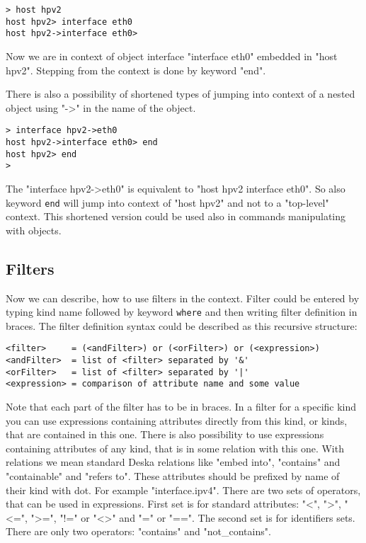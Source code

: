 \documentclass[deska]{subfiles}
\begin{document}
\begin{verbatim}
> host hpv2
host hpv2> interface eth0
host hpv2->interface eth0>
\end{verbatim}

Now we are in context of object interface "interface eth0" embedded in "host hpv2". Stepping from the context is done by
keyword "end".

There is also a possibility of shortened types of jumping into context of a nested object using "->" in the name of the
object.

\begin{verbatim}
> interface hpv2->eth0
host hpv2->interface eth0> end
host hpv2> end
>
\end{verbatim}

The "interface hpv2->eth0" is equivalent to "host hpv2 interface eth0". So also keyword {\tt end} will jump into context of
"host hpv2" and not to a "top-level" context. This shortened version could be used also in commands manipulating with
objects.

\subsection{Filters}

Now we can describe, how to use filters in the context. Filter could be entered by typing kind name followed by keyword
{\tt where} and then writing filter definition in braces. The filter definition syntax could be described as this recursive
structure:

\begin{verbatim}
<filter>     = (<andFilter>) or (<orFilter>) or (<expression>)
<andFilter>  = list of <filter> separated by '&'
<orFilter>   = list of <filter> separated by '|'
<expression> = comparison of attribute name and some value
\end{verbatim}

Note that each part of the filter has to be in braces. In a filter for a specific kind you can use expressions containing
attributes directly from this kind, or kinds, that are contained in this one. There is also possibility to use expressions
containing attributes of any kind, that is in some relation with this one. With relations we mean standard Deska relations
like "embed into", "contains" and "containable" and "refers to". These attributes should be prefixed by name of their
kind with dot. For example "interface.ipv4". There are two sets of operators, that can be used in expressions. First
set is for standard attributes: "<", ">", "<=", ">=", "!=" or "<>" and "=" or "==". The second set is for identifiers
sets. There are only two operators: "contains" and "not\_contains".
\end{document}
